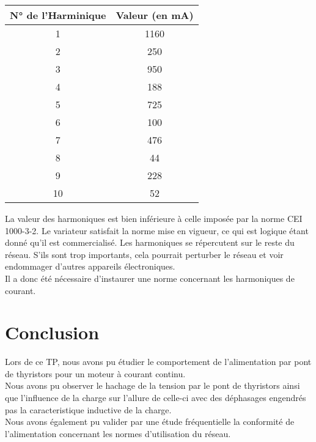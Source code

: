 \documentclass[oneside,a4paper,12pt]{article}
\begin{document}
	\begin{center}
	\begin{tabular}{|c|c|}
		\hline
		N° de l'Harminique & Valeur (en mA)\\
		\hline
		1 & 1160\\
		\hline
		2 & 250\\
		\hline
		3 & 950\\
		\hline
		4 & 188\\
		\hline
		5 & 725\\
		\hline
		6 & 100\\
		\hline
		7 & 476\\
		\hline
		8 & 44\\
		\hline
		9 & 228\\
		\hline
		10 & 52\\
		\hline
	\end{tabular}
	\end{center}

	La valeur des harmoniques est bien inférieure à celle imposée par la norme CEI 1000-3-2. Le variateur satisfait la norme mise en vigueur, ce qui est logique étant donné qu’il est commercialisé.
	Les harmoniques se répercutent sur le reste du réseau. S'ils sont trop importants, cela pourrait perturber le réseau et voir endommager d’autres appareils électroniques.\\
	Il a donc été nécessaire d’instaurer une norme concernant les harmoniques de courant. 
	
	\section{Conclusion}
	
	Lors de ce TP, nous avons pu étudier le comportement de l'alimentation par pont de thyristors pour un moteur à courant continu.\\
	Nous avons pu observer le hachage de la tension par le pont de thyristors ainsi que l'influence de la charge sur l'allure de celle-ci avec des déphasages engendrés pas la caracteristique inductive de la charge.\\
	
	Nous avons également pu valider par une étude fréquentielle la conformité de l'alimentation concernant les normes d'utilisation du réseau.\\
	
	\newpage
\end{document}

